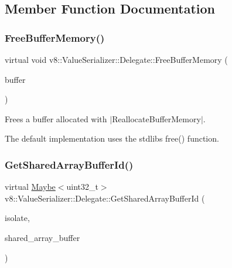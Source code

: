 \subsection{Member Function Documentation}
\mbox{\label{classv8_1_1ValueSerializer_1_1Delegate_a6cea3e757221e6e15b0fdb708482a176}} 
\subsubsection{\texorpdfstring{Free\+Buffer\+Memory()}{FreeBufferMemory()}}
{\footnotesize\ttfamily virtual void v8\+::\+Value\+Serializer\+::\+Delegate\+::\+Free\+Buffer\+Memory (\begin{DoxyParamCaption}\item[{void $\ast$}]{buffer }\end{DoxyParamCaption})\hspace{0.3cm}{\ttfamily [virtual]}}

Frees a buffer allocated with $\vert$\+Reallocate\+Buffer\+Memory$\vert$.

The default implementation uses the stdlib\textquotesingle{}s {\ttfamily free()} function. \mbox{\label{classv8_1_1ValueSerializer_1_1Delegate_a963946ef185d992552e8d9e0e4016137}} 
\subsubsection{\texorpdfstring{Get\+Shared\+Array\+Buffer\+Id()}{GetSharedArrayBufferId()}}
{\footnotesize\ttfamily virtual \mbox{\hyperlink{classv8_1_1Maybe}{Maybe}}$<$uint32\+\_\+t$>$ v8\+::\+Value\+Serializer\+::\+Delegate\+::\+Get\+Shared\+Array\+Buffer\+Id (\begin{DoxyParamCaption}\item[{\mbox{\hyperlink{classv8_1_1Isolate}{Isolate}} $\ast$}]{isolate,  }\item[{\mbox{\hyperlink{classv8_1_1Local}{Local}}$<$ \mbox{\hyperlink{classv8_1_1SharedArrayBuffer}{Shared\+Array\+Buffer}} $>$}]{shared\+\_\+array\+\_\+buffer }\end{DoxyParamCaption})\hspace{0.3cm}{\ttfamily [virtual]}}

